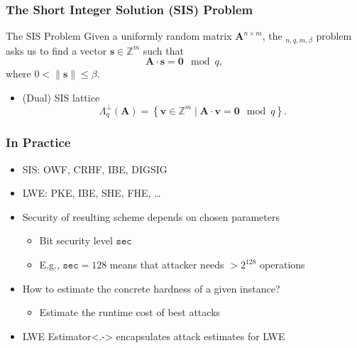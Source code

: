 \documentclass[t, aspectratio=169]{beamer}
\begin{document}
\begin{frame}
    \frametitle{The Short Integer Solution (SIS) Problem}
    \begin{block}{The SIS Problem}
        Given a uniformly random matrix $\mathbf{A}^{n\times m}$, the $_{n, q, m, \beta}$ problem asks us to find a vector $\mathbf{s} \in \mathbb{Z}^m$ such that
        \begin{equation*}
            \mathbf{A} \cdot \mathbf{s} = \mathbf{0} \mod q,
        \end{equation*}
        where $0 < \| \mathbf{s}\| \leq \beta$.
    \end{block}\pause
    \begin{itemize}[<+->]
        \item (Dual) SIS lattice
              \begin{equation*}
                  \Lambda_q^\perp(\mathbf{A}) = \left\{ \mathbf{v} \in \mathbb{Z}^m \mid  \mathbf{A}\cdot \mathbf{v} = \mathbf{0} \mod q \right\}.
              \end{equation*}
    \end{itemize}
\end{frame}

\begin{frame}
    \frametitle{In Practice}
    \begin{itemize}[<+->]
        \item SIS: OWF, CRHF, IBE, DIGSIG %
        \item LWE: PKE, IBE, SHE, FHE, \dots %
        \item Security of resulting scheme depends on chosen parameters %
              \begin{itemize}
                  \item Bit security level $\texttt{sec}$
                  \item E.g., $\texttt{sec}=128$ means that attacker needs $>2^{128}$ operations
              \end{itemize}
        \item How to estimate the concrete hardness of a given instance?
              \begin{itemize}
                  \item Estimate the runtime cost of best attacks
              \end{itemize}
        \item LWE Estimator\only<.->{} encapsulates attack estimates for LWE %
    \end{itemize}
\end{frame}
\end{document}
